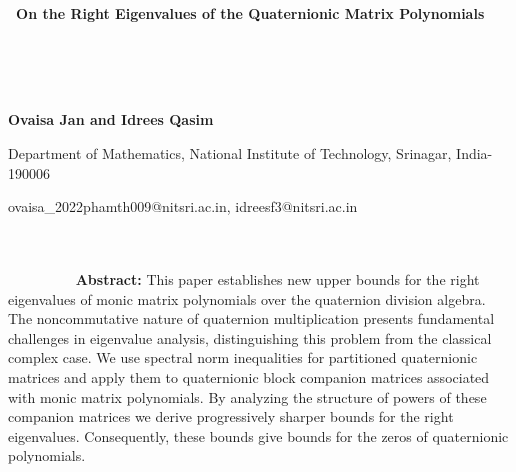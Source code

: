 \documentclass [12pt]{article}
\begin{document}
\thispagestyle{empty}
\null\vspace{-1cm}
\medskip
\vspace{1.75cm}
\centerline{\textbf{{\ On the Right Eigenvalues of the Quaternionic Matrix Polynomials}}}
~~~~~~~~~~~~~~~~~~~~~~~~~~~~~~~~~~~~~~~~~~~~~~~~~~~~~~~~~~~~~~~~~~~~~~~~~~~~~~~~~~~~~~~~~~~~~~~~~~~~~~~~~~~~~~~~~~~~~~~~~~~~~~~~~~~~~~~~~~~~~~~~~~~~~~~~~~~


\centerline{\bf  {Ovaisa Jan} and  {Idrees Qasim}}
\centerline {Department of Mathematics, National Institute of Technology, Srinagar, India-190006}
\centerline { ovaisa\_2022phamth009@nitsri.ac.in, idreesf3@nitsri.ac.in}
~~~~~~~~~~~~~~~~~~~~~~~~~~~~~~~~~~~~~~~~~~~~~~~~~~~~~~~~~~~~~~~~~~~~~~~~~~~~~~~~~~~~~~~~~~~~~~~~~~~~~~~~~~~~~~~~~~~~~~~~~~~~~~~~~~~~~~~~~~~~~~~~~~~~~~~~~
\vskip0.1in
\textbf{Abstract:} This paper establishes new upper bounds for the right eigenvalues of monic matrix polynomials over the quaternion division algebra. The noncommutative nature of quaternion multiplication presents fundamental challenges in eigenvalue analysis, distinguishing this problem from the classical complex case. We use spectral norm inequalities for partitioned quaternionic matrices and apply them to quaternionic block companion matrices associated with monic matrix polynomials. By analyzing the structure of powers of these companion matrices we derive progressively sharper bounds for the right eigenvalues. Consequently, these bounds give bounds for the zeros of quaternionic polynomials. \\



	\vspace{0.10in}
	~~~~~~~~~~~~~~~~~~~~~~~~~~~~~~~~~~~~~~~~~~~~~~~~~~~~~~~~~~~~~~~~~~~~~~~~~~~~~~~~~~~~~~~~~~~~~~~~~~~~~~~~~~~~~~~~~~~~~~~~~~~~~~~~~~~~~~~~~~~~~~~~~~~~~~~~~
	
	\\
	\vspace{0.1in}
\end{document}
